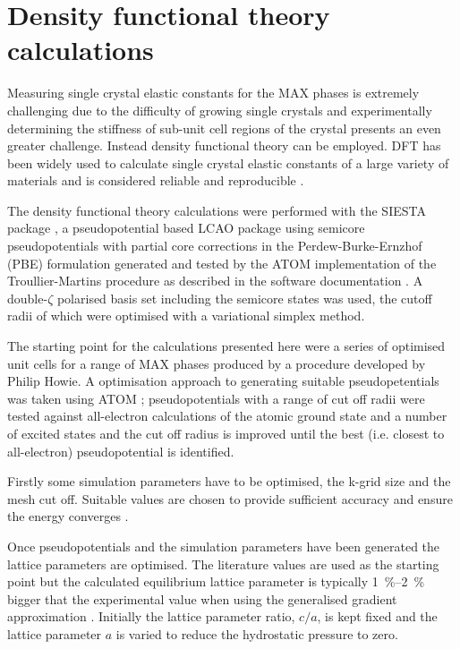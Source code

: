 \section{Density functional theory calculations}
\label{sec:DFT_method}



Measuring single crystal elastic constants for the MAX phases is extremely challenging due to the difficulty of growing single crystals and experimentally determining the stiffness of sub-unit cell regions of the crystal presents an even greater challenge. Instead density functional theory can be employed. DFT has been widely used to calculate single crystal elastic constants of a large variety of materials and is considered reliable and reproducible \cite{Lejaeghere2016}. 

The density functional theory calculations were performed with the SIESTA package \cite{soler2002}, a pseudopotential based LCAO package using semicore pseudopotentials with partial core corrections in the Perdew-Burke-Ernzhof (PBE) formulation generated and tested by the ATOM implementation \cite{soler2002} of the Troullier-Martins procedure \cite{Troullier1991,Troullier1991a} as described in the software documentation \cite{ATOM_manual}. A double-$\zeta$ polarised basis set including the semicore states was used, the cutoff radii of which were optimised with a variational simplex method.

The starting point for the calculations presented here were a series of optimised unit cells for a range of MAX phases produced by a procedure developed by Philip Howie. A optimisation approach to generating suitable pseudopetentials was taken using ATOM \cite{ATOM_manual}; pseudopotentials with a range of cut off radii were tested against all-electron calculations of the atomic ground state and a number of excited states and the cut off radius is improved until the best (i.e. closest to all-electron) pseudopotential is identified. 

Firstly some simulation parameters have to be optimised, the k-grid size and the mesh cut off. Suitable values are chosen to provide sufficient accuracy and ensure the energy converges \cite{SIESTA_manual}.

Once pseudopotentials and the simulation parameters have been generated the lattice parameters are optimised. The literature values are used as the starting point but the calculated equilibrium lattice parameter is typically \SIrange{1}{2}{\percent} bigger that the experimental value when using the generalised gradient approximation \cite{Staroverov2004,Wu2006}. Initially the lattice parameter ratio, $c/a$, is kept fixed and the lattice parameter $a$ is varied to reduce the hydrostatic pressure to zero.

